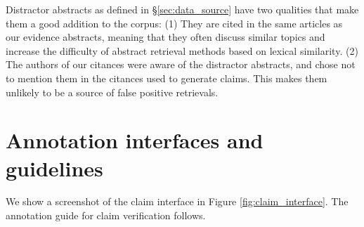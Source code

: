 Distractor abstracts as defined in \S\ref{sec:data_source} have two qualities that make them a good addition to the \ours corpus: (1) They are cited in the same articles as our evidence abstracts, meaning that they often discuss similar topics and increase the difficulty of abstract retrieval methods based on lexical similarity. (2) The authors of our citances were aware of the distractor abstracts, and chose not to mention them in the citances used to generate claims. This makes them unlikely to be a source of false positive retrievals.



\section{Annotation interfaces and guidelines} \label{sec:annotation_interfaces}

We show a screenshot of the claim interface in Figure \ref{fig:claim_interface}. The annotation guide for claim verification follows.


